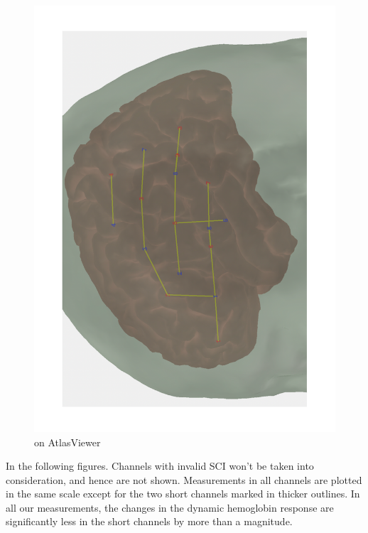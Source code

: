 \begin{figure}[H]
\begin{minipage}[c]{.22\linewidth}
  \includegraphics[scale= 0.2, angle = -90, origin= c] {pdf/atlas_optode_template}
  \caption{on AtlasViewer}
  \label{fig:test2}
\end{minipage}
\end{figure}

In the following figures. Channels with invalid SCI won't be taken into consideration, and hence are not shown. Measurements in all channels are plotted in the same scale except for the two short channels marked in thicker outlines. In all our measurements, the changes in the dynamic hemoglobin response are significantly less in the short channels by more than a magnitude.

